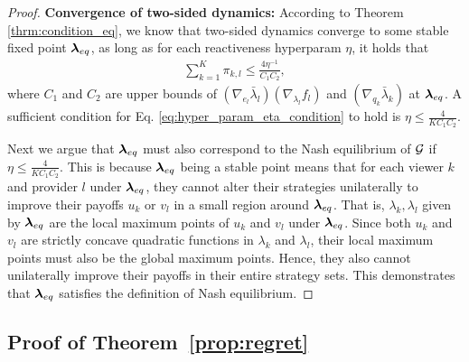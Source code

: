 \begin{proof}
 \textbf{Convergence of two-sided dynamics:} According to Theorem \ref{thrm:condition_eq}, we know that two-sided dynamics converge to some stable fixed point $\bm{\lambda}_{eq}$, as long as for each reactiveness hyperparam $\eta$, it holds that
 \begin{align}\label{eq:hyper_param_eta_condition}
    \sum_{k=1}^{K} \pi_{k,l} \leq \frac{4 \eta^{-1}}{C_1 C_2},
\end{align}
where $C_1$ and $C_2$ are upper bounds of $(\nabla_{e_l} \bar{\lambda}_l)(\nabla_{\lambda_l} f_l)$ and $(\nabla_{q_k} \bar{\lambda}_k)$ at $\bm{\lambda}_{eq}$. A sufficient condition for Eq. \eqref{eq:hyper_param_eta_condition} to hold is $\eta\leq \frac{4}{KC_1C_2}$. 

Next we argue that $\bm{\lambda}_{eq}$ must also correspond to the Nash equilibrium of $\mathcal{G}$ if $\eta\leq \frac{4}{KC_1C_2}$. This is because $\bm{\lambda}_{eq}$ being a stable point means that for each viewer $k$ and provider $l$ under $\bm{\lambda}_{eq}$, they cannot alter their strategies unilaterally to improve their payoffs $u_k$ or $v_l$ in a small region around $\bm{\lambda}_{eq}$. That is, $\lambda_k,\lambda_l$ given by $\bm{\lambda}_{eq}$ are the local maximum points of $u_k$ and $v_l$ under $\bm{\lambda}_{eq}$. Since both $u_k$ and $v_l$ are strictly concave quadratic functions in $\lambda_k$ and $\lambda_l$, their local maximum points must also be the global maximum points. Hence, they also cannot unilaterally improve their payoffs in their entire strategy sets. This demonstrates that $\bm{\lambda}_{eq}$ satisfies the definition of Nash equilibrium.

\end{proof}

\subsection{Proof of Theorem~\ref{prop:regret}} \label{proof:regret}

